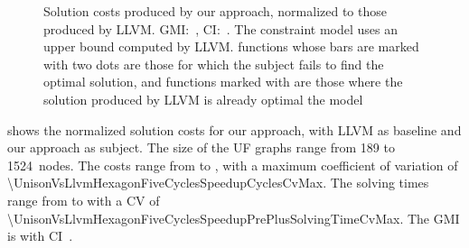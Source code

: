 

\begin{figure}
  \centering%
  \maxsizebox{\textwidth}{!}{%
    \trimBarchartPlot{%
    }%
  }

  \caption[Plot for evaluating the impact of our approach on code quality]%
          {%
            Solution costs produced by our approach, normalized to those
            produced by LLVM.
            GMI:~\printGMI{%
              \UnisonVsLlvmHexagonFiveCyclesSpeedupCyclesRegularSpeedupGmean%
            },
            CI:~\printGMICI{%
              \UnisonVsLlvmHexagonFiveCyclesSpeedupCyclesRegularSpeedupCiMin%
            }{%
              \UnisonVsLlvmHexagonFiveCyclesSpeedupCyclesRegularSpeedupCiMax%
            }.
            The constraint model uses an upper bound computed by LLVM.
            \Glspl{function} whose bars are marked with two dots are those for
            which the \gls{subject} fails to find the optimal solution, and
            \glspl{function} marked with \barValueNoSolution{} are those where
            the solution produced by \gls{LLVM} is already optimal \wrt the
            model%
          }
\end{figure}

 shows the normalized \gls{solution} costs
for our approach, with \gls{LLVM} as \gls{baseline} and our approach as
\gls{subject}.
%
The size of the \glspl{UF graph} range from \num{189} to
\num{1524}~\glspl{node}.
%
The costs range from
\printCycles{\UnisonVsLlvmHexagonFiveCyclesSpeedupCyclesAvgMin} to
\printCycles{\UnisonVsLlvmHexagonFiveCyclesSpeedupCyclesAvgMax}, with a maximum
coefficient of variation of
\num{\UnisonVsLlvmHexagonFiveCyclesSpeedupCyclesCvMax}.
%
The solving times range from
\printSolvingTime{\UnisonVsLlvmHexagonFiveCyclesSpeedupPrePlusSolvingTimeAvgMin}
to
\printSolvingTime{\UnisonVsLlvmHexagonFiveCyclesSpeedupPrePlusSolvingTimeAvgMax}
with a \gls{CV} of
\num{\UnisonVsLlvmHexagonFiveCyclesSpeedupPrePlusSolvingTimeCvMax}.
%
The \gls{GMI} is \printGMI{%
  \UnisonVsLlvmHexagonFiveCyclesSpeedupCyclesRegularSpeedupGmean%
} with \gls{CI}~\printGMICI{%
  \UnisonVsLlvmHexagonFiveCyclesSpeedupCyclesRegularSpeedupCiMin%
}{%
  \UnisonVsLlvmHexagonFiveCyclesSpeedupCyclesRegularSpeedupCiMax%
}.

